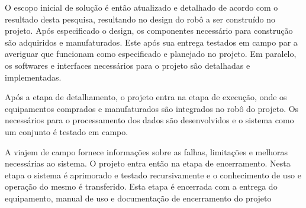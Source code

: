 O escopo inicial de solução é então atualizado e detalhado de acordo com o 
resultado desta pesquisa, resultando no design do robô a ser construído no projeto. 
Após especificado o design, os componentes necessário para construção são adquiridos
e manufaturados. Este após sua entrega testados em campo par a averiguar que 
funcionam como especificado e planejado no projeto. Em paralelo, os softwares e 
interfaces necessários para o projeto são detalhadas e implementadas.  

Após a etapa de detalhamento, o projeto entra na etapa de execução, onde os 
equipamentos comprados e manufaturados são integrados no robô do projeto. Os 
 necessários para o processamento dos dados são desenvolvidos e o sistema como 
 um conjunto é testado em campo. 

A viajem de campo fornece informações sobre as falhas, limitações e melhoras 
necessárias ao sistema. O projeto entra então na etapa de encerramento. Nesta 
etapa o sistema é aprimorado e testado recursivamente e o conhecimento de uso e 
operação do mesmo é transferido. Esta etapa é encerrada com a entrega do equipamento, 
manual de uso e documentação de encerramento do projeto

